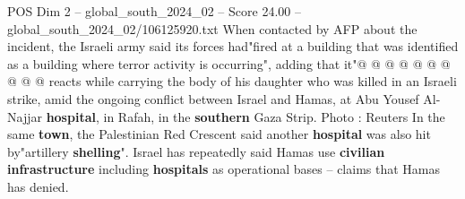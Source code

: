 \begin{textsample}{POS Dim 2 – global\_south\_2024\_02 – Score 24.00 – global\_south\_2024\_02/106125920.txt}
When contacted by AFP about the incident, the Israeli army said its forces had"fired at a building that was identified as a building where terror activity is occurring", adding that it"@ @ @ @ @ @ @ @ @ @ reacts while carrying the body of his daughter who was killed in an Israeli strike, amid the ongoing conflict between Israel and Hamas, at Abu Yousef Al-Najjar \textbf{hospital}, in Rafah, in the \textbf{southern} Gaza Strip.
Photo : Reuters In the same \textbf{town}, the Palestinian Red Crescent said another \textbf{hospital} was also hit by"artillery \textbf{shelling}".
Israel has repeatedly said Hamas use \textbf{civilian} \textbf{infrastructure} including \textbf{hospitals} as operational bases -- claims that Hamas has denied.

\end{textsample}
